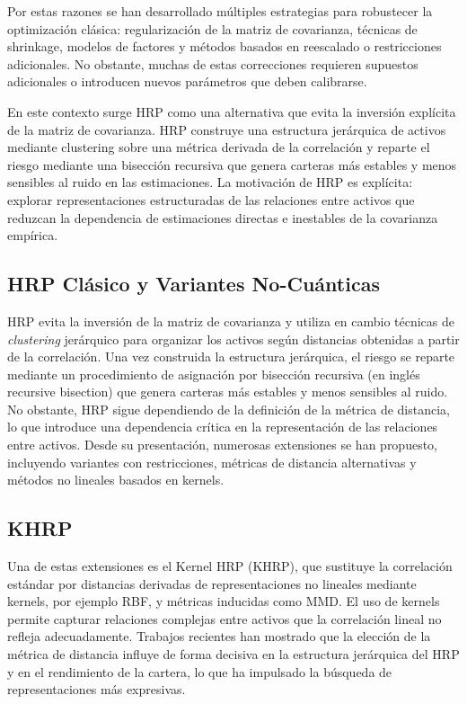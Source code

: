 Por estas razones se han desarrollado múltiples estrategias para robustecer la optimización clásica: regularización de la matriz de covarianza, técnicas de shrinkage, modelos de factores y métodos basados en reescalado o restricciones adicionales. No obstante, muchas de estas correcciones requieren supuestos adicionales o introducen nuevos parámetros que deben calibrarse.

En este contexto surge \gls{HRP}\cite{lopezdeprado2016hrp} como una alternativa que evita la inversión explícita de la matriz de covarianza. \gls{HRP} construye una estructura jerárquica de activos mediante clustering sobre una métrica derivada de la correlación y reparte el riesgo mediante una bisección recursiva que genera carteras más estables y menos sensibles al ruido en las estimaciones. La motivación de \gls{HRP} es explícita: explorar representaciones estructuradas de las relaciones entre activos que reduzcan la dependencia de estimaciones directas e inestables de la covarianza empírica.

\subsection{HRP Clásico y Variantes No-Cuánticas}
\label{subsec:hrp_clas_y_variantes_no_cuanticas}
HRP evita la inversión de la matriz de covarianza y
utiliza en cambio técnicas de \textit{clustering} jerárquico para organizar los activos según distancias
obtenidas a partir de la correlación. Una vez construida la estructura jerárquica, el riesgo se
reparte mediante un procedimiento de asignación por bisección recursiva (en inglés recursive bisection) que
genera carteras más estables y menos sensibles al ruido.
No obstante, HRP sigue dependiendo de la definición de la métrica de distancia, lo que introduce
una dependencia crítica en la representación de las relaciones entre activos.
Desde su presentación, numerosas extensiones se han propuesto, incluyendo variantes con
restricciones\cite{pfitzinger2019constrainedhrp}, métricas de distancia alternativas
\cite{salasmolina2025hrpdist} y métodos no lineales basados en kernels.

\subsection{KHRP}
\label{subsec:khrp}
Una de estas extensiones es el Kernel \gls{HRP} (\gls{KHRP}), que sustituye la correlación estándar por
distancias derivadas de representaciones no lineales mediante kernels, por ejemplo \gls{RBF}, y métricas inducidas
como \gls{MMD}. El uso de kernels permite capturar relaciones complejas entre activos que la correlación
lineal no refleja adecuadamente\cite{sriperumbudur2011kernels}. Trabajos recientes han mostrado que
la elección de la métrica de distancia influye de forma decisiva en la estructura jerárquica del
\gls{HRP} y en el rendimiento de la cartera\cite{salasmolina2025hrpdist}, lo que ha impulsado la búsqueda
de representaciones más expresivas.


